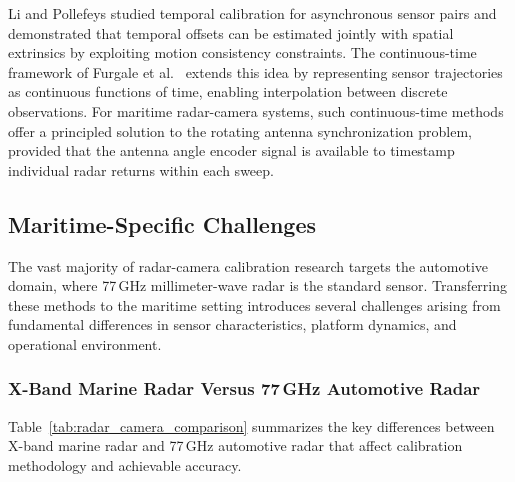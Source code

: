 Li and Pollefeys \cite{li2011temporal} studied temporal calibration for asynchronous sensor pairs and demonstrated that temporal offsets can be estimated jointly with spatial extrinsics by exploiting motion consistency constraints. The continuous-time framework of Furgale et al.\ \cite{furgale2013unified} extends this idea by representing sensor trajectories as continuous functions of time, enabling interpolation between discrete observations. For maritime radar-camera systems, such continuous-time methods offer a principled solution to the rotating antenna synchronization problem, provided that the antenna angle encoder signal is available to timestamp individual radar returns within each sweep.

\subsection{Maritime-Specific Challenges}\label{sec:maritime_challenges}

The vast majority of radar-camera calibration research targets the automotive domain, where 77\,GHz millimeter-wave radar is the standard sensor. Transferring these methods to the maritime setting introduces several challenges arising from fundamental differences in sensor characteristics, platform dynamics, and operational environment.

\subsubsection{X-Band Marine Radar Versus 77\,GHz Automotive Radar}

Table~\ref{tab:radar_camera_comparison} summarizes the key differences between X-band marine radar and 77\,GHz automotive radar that affect calibration methodology and achievable accuracy.

